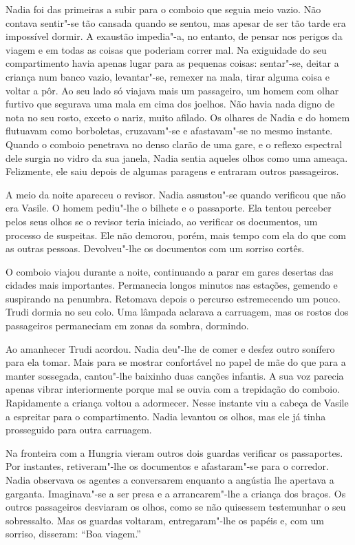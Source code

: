 Nadia foi das primeiras a subir para o comboio que
seguia meio vazio. Não contava sentir"-se tão cansada quando se sentou,
mas apesar de ser tão tarde era impossível dormir. A exaustão
impedia"-a, no entanto, de pensar nos perigos da viagem e em todas as
coisas que poderiam correr mal. Na exiguidade do seu compartimento havia
apenas lugar para as pequenas coisas: sentar"-se, deitar a criança num
banco vazio, levantar"-se, remexer na mala, tirar alguma coisa e voltar a
pôr. Ao seu lado só viajava mais um passageiro, um homem com olhar
furtivo que
segurava uma mala em cima dos joelhos. Não havia nada digno de nota no
seu rosto, exceto o nariz, muito afilado. Os olhares de Nadia e do
homem flutuavam como borboletas, cruzavam"-se e afastavam"-se no mesmo
instante. Quando o comboio penetrava no denso clarão de uma gare, e o
reflexo espectral dele surgia no vidro da sua janela, Nadia sentia
aqueles olhos como uma ameaça. Felizmente, ele saiu depois de algumas
paragens e entraram outros passageiros.

A meio da noite apareceu o revisor. Nadia assustou"-se quando verificou
que não era Vasile. O homem pediu"-lhe o bilhete e o passaporte. Ela
tentou perceber pelos seus olhos se o revisor teria iniciado, ao
verificar os documentos, um processo de suspeitas. Ele não demorou,
porém, mais tempo com ela do que com as outras pessoas. Devolveu"-lhe os
documentos com um sorriso cortês.

O comboio viajou durante a noite, continuando a parar em gares desertas
das cidades mais importantes. Permanecia longos minutos nas estações,
gemendo e suspirando na penumbra. Retomava depois o percurso
estremecendo um pouco. Trudi dormia no seu colo. Uma lâmpada aclarava a
carruagem, mas os rostos dos passageiros permaneciam em zonas da sombra,
dormindo.

Ao amanhecer Trudi acordou. Nadia deu"-lhe de comer e desfez outro
sonífero para ela tomar. Mais para se mostrar confortável no papel de
mãe do que para a manter sossegada, cantou"-lhe baixinho duas canções
infantis. A sua voz parecia apenas vibrar interiormente porque mal se
ouvia com a trepidação do comboio. Rapidamente a criança voltou a
adormecer. Nesse instante viu a cabeça de
Vasile a espreitar para o compartimento. Nadia levantou os olhos, mas
ele já tinha prosseguido para outra carruagem.

Na fronteira com a
Hungria vieram outros dois guardas verificar os passaportes. Por
instantes, retiveram"-lhe os documentos e afastaram"-se para o corredor.
Nadia observava os agentes a conversarem enquanto a angústia lhe
apertava a garganta. Imaginava"-se a ser presa e a arrancarem"-lhe a
criança dos braços. Os outros passageiros desviaram os olhos, como se
não quisessem testemunhar o seu sobressalto. Mas os guardas voltaram,
entregaram"-lhe os
papéis e, com um sorriso, disseram: ``Boa viagem.''

